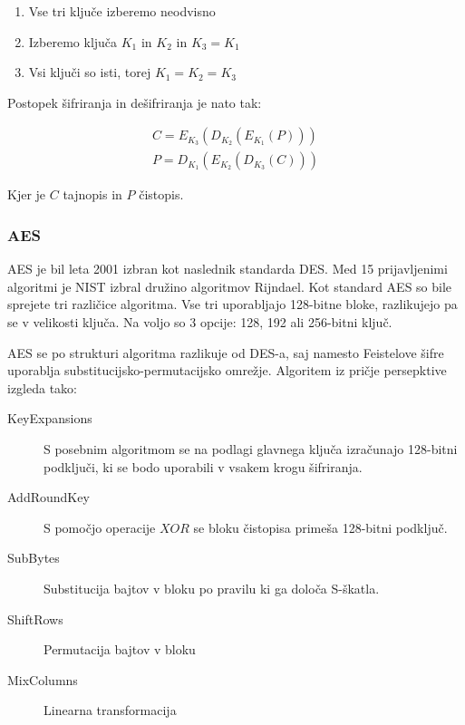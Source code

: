\documentclass[12pt,a4paper,openany]{book}
\begin{document}
\begin{enumerate}
\item Vse tri ključe izberemo neodvisno
\item Izberemo ključa $K_1$ in $K_2$ in $K_3=K_1$
\item Vsi ključi so isti, torej $K_1=K_2=K_3$
\end{enumerate}

Postopek šifriranja in dešifriranja je nato tak:

\begin{gather*}
C=E_{K_3}(D_{K_2}(E_{K_1}(P))) \\
P=D_{K_1}(E_{K_2}(D_{K_3}(C)))
\end{gather*}

Kjer je $C$ tajnopis in $P$ čistopis.



\subsubsection{AES}

\gls{AES} je bil leta 2001 izbran kot naslednik standarda \gls{DES}. Med 15 prijavljenimi algoritmi je \gls{NIST} izbral družino algoritmov Rijndael. Kot standard \gls{AES} so bile sprejete tri različice algoritma. Vse tri uporabljajo 128-bitne bloke, razlikujejo pa se v velikosti ključa. Na voljo so 3 opcije: 128, 192 ali 256-bitni ključ.

\gls{AES} se po strukturi algoritma razlikuje od \gls{DES}-a, saj namesto Feistelove šifre uporablja substitucijsko-permutacijsko omrežje.  Algoritem iz pričje persepktive izgleda tako:

\begin{description}
	\item[KeyExpansions] S posebnim algoritmom se na podlagi glavnega ključa izračunajo 128-bitni podključi, ki se bodo uporabili v vsakem krogu šifriranja.
	\item[AddRoundKey]  S pomočjo operacije $XOR$ se bloku čistopisa primeša 128-bitni podključ.
	\item[SubBytes] Substitucija bajtov v bloku po pravilu ki ga določa S-škatla.
	\item[ShiftRows] Permutacija bajtov v bloku
	\item[MixColumns] Linearna transformacija
\end{description}
\end{document}

